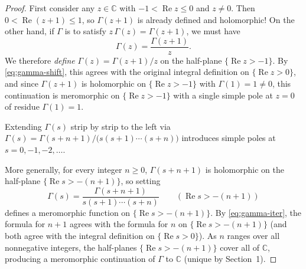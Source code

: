\documentclass[11pt]{article}
\theoremstyle{plain}
\theoremstyle{definition}
\theoremstyle{boldremark}
\theoremstyle{remark}
\numberwithin{equation}{section}
\newcommand{\C}{\mathbb{C}}
\DeclareMathOperator{\Real}{Re}
\newenvironment{lecturefigure}
 {\par\addvspace{0.25em}\begingroup\setlength{\parskip}{0pt}\centering}
 {\par\endgroup\addvspace{0.25em}}
\begin{document}
\begin{proof}
First consider any $z\in\C$ with $-1 < \Real z \leq 0$ and $z\neq 0$. Then
$0 < \Real(z+1) \leq 1$, so $\Gamma(z+1)$ is already defined and
holomorphic! On the other hand, if $\Gamma$ is to satisfy
$z\,\Gamma(z)=\Gamma(z+1)$, we must have
\[
 \Gamma(z) = \frac{\Gamma(z+1)}{z}.
\]
We therefore \emph{define} $\Gamma(z)=\Gamma(z+1)/z$ on the half-plane
$\{\Real z > -1\}$. By \eqref{eq:gamma-shift}, this agrees with the
original integral definition on $\{\Real z > 0\}$, and since $\Gamma(z+1)$
is holomorphic on $\{\Real z > -1\}$ with $\Gamma(1)=1\neq 0$, this
continuation is meromorphic on $\{\Real z > -1\}$ with a single simple pole
at $z=0$ of residue $\Gamma(1)=1$.

\begin{lecturefigure}
\begin{minipage}{\linewidth}\centering
{}

\vspace{0.15em}
{\small Extending $\Gamma(s)$ strip by strip to the left via
$\Gamma(s)=\Gamma(s+n+1)/\bigl(s(s+1)\cdots(s+n)\bigr)$ introduces simple
poles at $s=0,-1,-2,\dots$.}
\end{minipage}
\end{lecturefigure}

More generally, for every integer $n\geq 0$, $\Gamma(s+n+1)$ is holomorphic
on the half-plane $\{\Real s > -(n+1)\}$, so setting
\begin{equation}\label{eq:gamma-ext-n}
 \Gamma(s) = \frac{\Gamma(s+n+1)}{s(s+1)\cdots(s+n)}
 \qquad (\Real s > -(n+1))
\end{equation}
defines a meromorphic function on $\{\Real s > -(n+1)\}$. By
\eqref{eq:gamma-iter}, the formula for $n+1$ agrees with the formula for
$n$ on $\{\Real s > -(n+1)\}$ (and both agree with the integral definition
on $\{\Real s > 0\}$). As $n$ ranges over all nonnegative integers, the
half-planes $\{\Real s > -(n+1)\}$ cover all of $\C$, producing a
meromorphic continuation of $\Gamma$ to $\C$ (unique by Section~1).


\end{proof}
\end{document}
